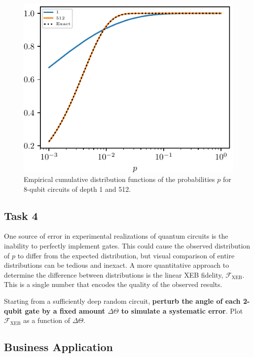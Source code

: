 \documentclass[12pt]{article}
\begin{document}
\begin{figure}
	\centering
	\includegraphics{images/dists_N=008}
	\caption{
		Empirical cumulative distribution functions of the probabilities $p$ for 8-qubit circuits of depth 1 and 512.
	}
	\label{fig:dists}
\end{figure}


\subsection*{Task 4}

One source of error in experimental realizations of quantum circuits is the inability to perfectly implement gates.
This could cause the observed distribution of $p$ to differ from the expected distribution, but visual comparison of entire distributions can be tedious and inexact.
A more quantitative approach to determine the difference between distributions is the linear XEB fidelity, $\mathcal{F}_\mathrm{XEB}$.
This is a single number that encodes the quality of the observed results.

Starting from a sufficiently deep random circuit, \textbf{perturb the angle of each 2-qubit gate by a fixed amount $\Delta \Theta$ to simulate a systematic error}.
Plot $\mathcal{F}_\mathrm{XEB}$ as a function of $\Delta \Theta$.


\subsection*{Business Application}
\end{document}
